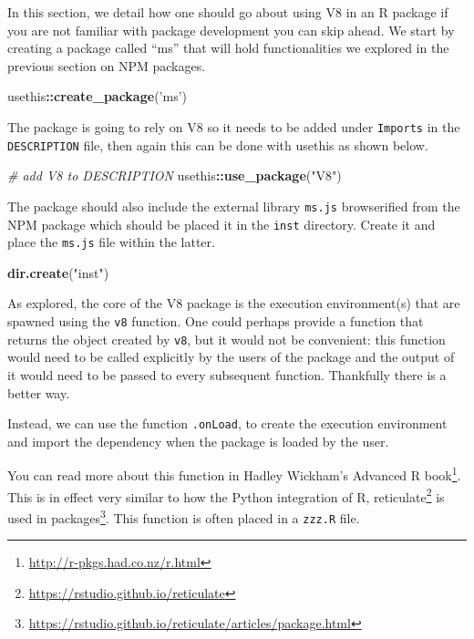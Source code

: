 \documentclass[10pt,]{krantz}
\makeatletter
\newenvironment{Shaded}{\begin{snugshade}}{\end{snugshade}}
\newcommand{\CommentTok}[1]{\textcolor[rgb]{0.37,0.37,0.37}{\textit{#1}}}
\newcommand{\KeywordTok}[1]{\textcolor[rgb]{0.27,0.27,0.27}{\textbf{#1}}}
\newcommand{\NormalTok}[1]{#1}
\newcommand{\OperatorTok}[1]{\textcolor[rgb]{0.43,0.43,0.43}{\textbf{#1}}}
\newcommand{\StringTok}[1]{\textcolor[rgb]{0.5,0.5,0.5}{#1}}
\renewcommand{\href}[2]{#2\footnote{\url{#1}}}
\newenvironment{kframe}{%
\medskip{}
\setlength{\fboxsep}{.8em}
 \def\at@end@of@kframe{}%
 \ifinner\ifhmode%
  \def\at@end@of@kframe{\end{minipage}}%
  \begin{minipage}{\columnwidth}%
 \fi\fi%
 \def\FrameCommand##1{\hskip\@totalleftmargin \hskip-\fboxsep
 \colorbox{shadecolor}{##1}\hskip-\fboxsep
     \hskip-\linewidth \hskip-\@totalleftmargin \hskip\columnwidth}%
 \MakeFramed {\advance\hsize-\width
   \@totalleftmargin\z@ \linewidth\hsize
   \@setminipage}}%
 {\par\unskip\endMakeFramed%
 \at@end@of@kframe}
\renewenvironment{Shaded}{\begin{kframe}}{\end{kframe}}
\makeatother
\begin{document}
In this section, we detail how one should go about using V8 in an R package if you are not familiar with package development you can skip ahead. We start by creating a package called ``ms'' that will hold functionalities we explored in the previous section on NPM packages.

\begin{Shaded}
\begin{Highlighting}[]
\NormalTok{usethis}\OperatorTok{::}\KeywordTok{create_package}\NormalTok{(}\StringTok{'ms'}\NormalTok{)}
\end{Highlighting}
\end{Shaded}

The package is going to rely on V8 so it needs to be added under \texttt{Imports} in the \texttt{DESCRIPTION} file, then again this can be done with usethis as shown below.

\begin{Shaded}
\begin{Highlighting}[]
\CommentTok{# add V8 to DESCRIPTION}
\NormalTok{usethis}\OperatorTok{::}\KeywordTok{use_package}\NormalTok{(}\StringTok{"V8"}\NormalTok{)}
\end{Highlighting}
\end{Shaded}

The package should also include the external library \texttt{ms.js} browserified from the NPM package which should be placed it in the \texttt{inst} directory. Create it and place the \texttt{ms.js} file within the latter.

\begin{Shaded}
\begin{Highlighting}[]
\KeywordTok{dir.create}\NormalTok{(}\StringTok{"inst"}\NormalTok{)}
\end{Highlighting}
\end{Shaded}

As explored, the core of the V8 package is the execution environment(s) that are spawned using the \texttt{v8} function. One could perhaps provide a function that returns the object created by \texttt{v8}, but it would not be convenient: this function would need to be called explicitly by the users of the package and the output of it would need to be passed to every subsequent function. Thankfully there is a better way.

Instead, we can use the function \texttt{.onLoad}, to create the execution environment and import the dependency when the package is loaded by the user.

You can read more about this function in Hadley Wickham's \href{http://r-pkgs.had.co.nz/r.html}{Advanced R book}. This is in effect very similar to how the Python integration of R, \href{https://rstudio.github.io/reticulate}{reticulate} \citep{R-reticulate} is \href{https://rstudio.github.io/reticulate/articles/package.html}{used in packages}. This function is often placed in a \texttt{zzz.R} file.
\end{document}
